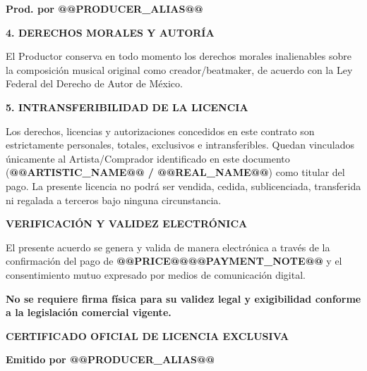 \documentclass[11pt]{article}
\begin{document}
\vspace{6pt}
\textbf{Prod. por @@PRODUCER_ALIAS@@}

\vspace{12pt}

\textbf{4. \quad DERECHOS MORALES Y AUTORÍA}

\vspace{4pt}
El Productor conserva en todo momento los derechos morales inalienables sobre la composición musical original como creador/beatmaker, de acuerdo con la Ley Federal del Derecho de Autor de México.

\vspace{12pt}

\textbf{5. \quad INTRANSFERIBILIDAD DE LA LICENCIA}

\vspace{4pt}
Los derechos, licencias y autorizaciones concedidos en este contrato son estrictamente personales, totales, exclusivos e intransferibles. Quedan vinculados únicamente al Artista/Comprador identificado en este documento (\textbf{@@ARTISTIC_NAME@@ / @@REAL_NAME@@}) como titular del pago. La presente licencia no podrá ser vendida, cedida, sublicenciada, transferida ni regalada a terceros bajo ninguna circunstancia.

\vspace{20pt}

\begin{center}
\textbf{VERIFICACIÓN Y VALIDEZ ELECTRÓNICA}
\end{center}

\vspace{10pt}

El presente acuerdo se genera y valida de manera electrónica a través de la confirmación del pago de \textbf{@@PRICE@@@@PAYMENT_NOTE@@} y el consentimiento mutuo expresado por medios de comunicación digital.

\vspace{8pt}
\textbf{\small No se requiere firma física para su validez legal y exigibilidad conforme a la legislación comercial vigente.}

\vspace{30pt}

\begin{center}
\textbf{CERTIFICADO OFICIAL DE LICENCIA EXCLUSIVA}

\vspace{8pt}
\textbf{Emitido por @@PRODUCER_ALIAS@@}
\end{center}
\end{document}
